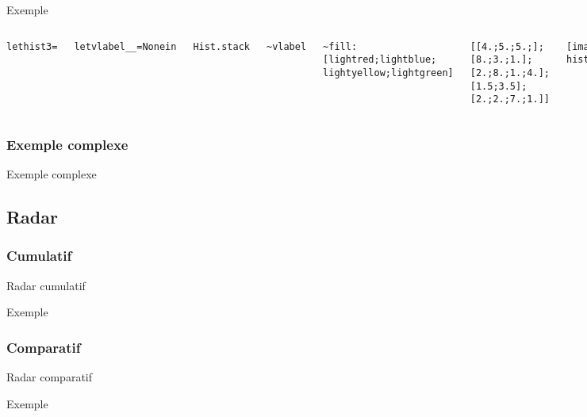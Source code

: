 \documentclass{beamer}
\begin{document}
\begin{frame}{Exemple}
  \begin{columns}
    \begin{alltt}
      let hist3 =

      let vlabel \_ \_ = None in

      Hist.stack
 
      \textasciitilde vlabel

      \textasciitilde fill:[lightred;lightblue;
      lightyellow;lightgreen]

      [[4.;5.;5.;]; [8.;3.;1.]; [2.;8.;1.;4.];
      [1.5;3.5];[2.;2.;7.;1.]]
    \end{alltt}
    \begin{center}
      \texttt{[image: hist3.mps]}
    \end{center}
  \end{columns}
\end{frame}

\subsubsection{Exemple complexe}
\begin{frame}{Exemple complexe}
\end{frame}

\subsection{Radar}
\subsubsection{Cumulatif}
\begin{frame}{Radar cumulatif}
\end{frame}

\begin{frame}{Exemple}
\end{frame}

\subsubsection{Comparatif}
\begin{frame}{Radar comparatif}
\end{frame}

\begin{frame}{Exemple}
\end{frame}
\end{document}
